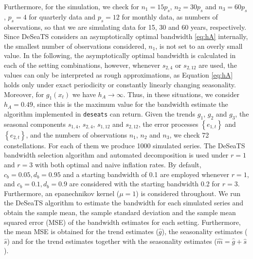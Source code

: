 Furthermore, for the simulation, we check for \(n_\text{1}=15p_s\), \(n_{\text{2}}=30p_s\) and \(n_{3}=60p_s\), \(p_s=4\) for quarterly data and \(p_s=12\) for monthly data, as numbers of observations, so that we are simulating data for 15, 30 and 60 years, respectively. Since DeSeaTS considers an asymptotically optimal bandwidth \eqref{eq:hA} internally, the smallest number of observations considered, \(n_1\), is not set to an overly small value. In the following, the asymptotically optimal bandwidth is calculated in each of the setting combinations, however, whenever \(s_{2,4}\) or \(s_{2,12}\) are used, the values can only be interpreted as rough approximations, as Equation \eqref{eq:hA} holds only under exact periodicity or constantly linearly changing seasonality. Moreover, for \(g_1(x_t)\) we have \(h_A\rightarrow \infty\). Thus, in these situations, we consider \(h_A=0.49\), since this is the maximum value for the bandwidth estimate the algorithm implemented in \texttt{deseats} can return. Given the trends \(g_1\), \(g_2\) and \(g_3\), the seasonal components \(s_{1,4}\), \(s_{2,4}\), \(s_{1,12}\) and \(s_{2,12}\), the error processes \(\left\{e_{1,t}\right\}\) and \(\left\{e_{2,t}\right\}\), and the numbers of observations \(n_1\), \(n_2\) and \(n_3\), we check 72 constellations. For each of them we produce 1000 simulated series. The DeSeaTS bandwidth selection algorithm and automated decomposition is used under \(r=1\) and \(r = 3\) with both optimal and naive inflation rates. By default, \(c_b=0.05,d_b=0.95\) and a starting bandwidth of 0.1 are employed whenever \(r=1\), and \(c_b=0.1,d_b=0.9\) are considered with the starting bandwidth 0.2 for \(r=3\). Furthermore, an epanechnikov kernel (\(\mu=1\)) is considered throughout. We run the DeSeaTS algorithm to estimate the bandwidth for each simulated series and obtain the sample mean, the sample standard deviation and the sample mean squared error (MSE) of the bandwidth estimates for each setting. Furthermore, the mean MSE is obtained for the trend estimates (\(\hat g\)), the seasonality estimates (\(\hat s\)) and for the trend estimates together with the seasonality estimates (\(\hat m = \hat g + \hat s\)).

